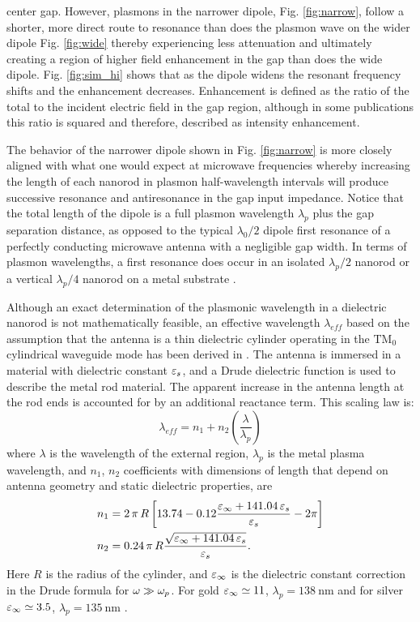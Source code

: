 center gap. However, plasmons in the narrower dipole, Fig. \ref{fig:narrow}, follow a shorter, more direct route to resonance than does the plasmon wave on the wider dipole Fig. \ref{fig:wide} thereby experiencing less attenuation and ultimately creating a region of higher field enhancement in the gap than does the wide dipole. Fig. \ref{fig:sim_hi} shows that as the dipole widens the resonant frequency shifts and the enhancement decreases.  Enhancement is defined as the ratio of the total to the incident electric field in the gap region, although in some publications this ratio is squared and therefore, described as intensity enhancement.

The behavior of the narrower dipole shown in Fig. \ref{fig:narrow} is more closely aligned with what one would expect at microwave frequencies whereby increasing the length of each nanorod in plasmon half-wavelength intervals will produce successive resonance and antiresonance in the gap input impedance. Notice that the total length of the dipole is a full plasmon wavelength $\lambda_p$ plus the gap separation distance, as opposed to the typical $\lambda_0/2$ dipole first resonance of a perfectly conducting microwave antenna with a negligible gap width. In terms of plasmon wavelengths, a first resonance does occur in an isolated $\lambda_p/2$ nanorod or a vertical $\lambda_p/4$ nanorod on a metal substrate \cite{Taminiau2007}.

Although an exact determination of the plasmonic wavelength in a dielectric nanorod is not mathematically feasible, an effective wavelength $\lambda_{eff}$ based on the assumption that the antenna is a thin dielectric cylinder operating in the $\mathrm{TM}_0$ cylindrical waveguide mode has been derived in \cite{Novotny2007}. The antenna is immersed in a material with dielectric constant $\varepsilon_s$, and a Drude dielectric function is used to describe the metal rod material. The apparent increase in the antenna length at the rod ends is accounted for by an additional reactance term. This scaling law is:
%
\begin{equation}
  \lambda_{eff} = n_1 + n_2\left( \frac{\lambda}{\lambda_p} \right)
  \label{eq:lambda_eff}
\end{equation}
%
where $\lambda$ is the wavelength of the external region, $\lambda_p$ is the metal plasma wavelength, and $n_1$, $n_2$ coefficients with dimensions of length that depend on antenna geometry and static dielectric properties, are
%
\begin{subequations}
  \begin{align}
    n_1 ={}& 2\, \pi\, R \left[ 13.74 - 0.12 \frac{\varepsilon_\infty + 141.04\, \varepsilon_s}{\varepsilon_s} - 2\pi \right]
    \label{eq:n1}\\
    n_2 ={}& 0.24\, \pi\, R \frac{\sqrt{\varepsilon_\infty + 141.04 \, \varepsilon_s}}{\varepsilon_s}.
    \label{eq:n2}
  \end{align}
  \label{eq:ns}%
\end{subequations}
%
Here $R$ is the radius of the cylinder, and $\varepsilon_{\infty}$ is the dielectric constant correction in the Drude formula for $\omega \gg \omega_p$. For gold $\varepsilon_\infty \simeq 11$, $\lambda_p = \SI{138}{\nm}$ and for silver $\varepsilon_\infty \simeq 3.5$, $\lambda_p = \SI{135}{\nm}$ \cite{Novotny2007}.

